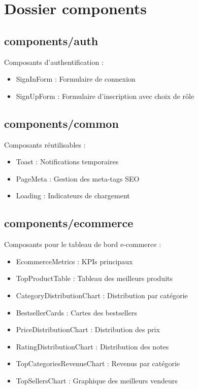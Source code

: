 \documentclass[12pt,a4paper]{report}
\begin{document}
\section{Dossier components}

\subsection{components/auth}

Composants d'authentification :
\begin{itemize}[noitemsep]
    \item SignInForm : Formulaire de connexion
    \item SignUpForm : Formulaire d'inscription avec choix de rôle
\end{itemize}

\subsection{components/common}

Composants réutilisables :
\begin{itemize}[noitemsep]
    \item Toast : Notifications temporaires
    \item PageMeta : Gestion des meta-tags SEO
    \item Loading : Indicateurs de chargement
\end{itemize}

\subsection{components/ecommerce}

Composants pour le tableau de bord e-commerce :
\begin{itemize}[noitemsep]
    \item EcommerceMetrics : KPIs principaux
    \item TopProductTable : Tableau des meilleurs produits
    \item CategoryDistributionChart : Distribution par catégorie
    \item BestsellerCards : Cartes des bestsellers
    \item PriceDistributionChart : Distribution des prix
    \item RatingDistributionChart : Distribution des notes
    \item TopCategoriesRevenueChart : Revenus par catégorie
    \item TopSellersChart : Graphique des meilleurs vendeurs
\end{itemize}
\end{document}
